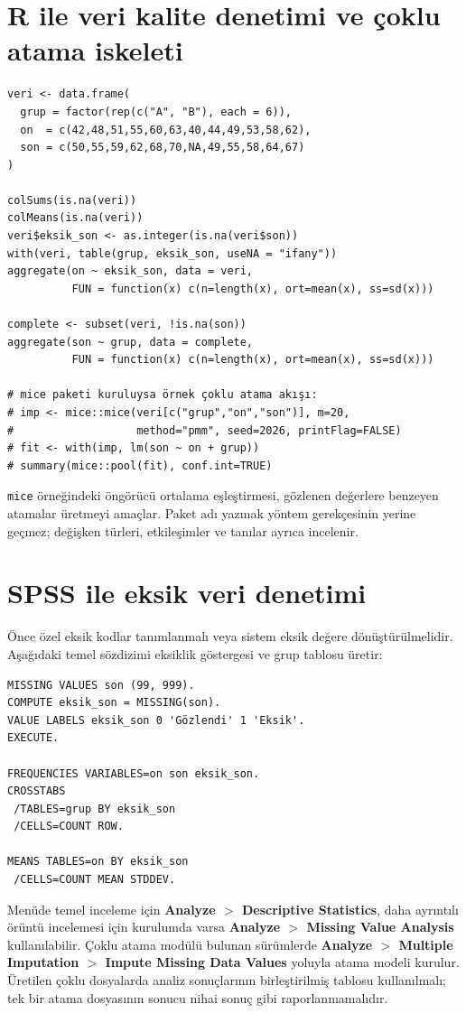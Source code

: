 \section{R ile veri kalite denetimi ve çoklu atama iskeleti}

\begin{lstlisting}[style=prismR]
veri <- data.frame(
  grup = factor(rep(c("A", "B"), each = 6)),
  on  = c(42,48,51,55,60,63,40,44,49,53,58,62),
  son = c(50,55,59,62,68,70,NA,49,55,58,64,67)
)

colSums(is.na(veri))
colMeans(is.na(veri))
veri$eksik_son <- as.integer(is.na(veri$son))
with(veri, table(grup, eksik_son, useNA = "ifany"))
aggregate(on ~ eksik_son, data = veri,
          FUN = function(x) c(n=length(x), ort=mean(x), ss=sd(x)))

complete <- subset(veri, !is.na(son))
aggregate(son ~ grup, data = complete,
          FUN = function(x) c(n=length(x), ort=mean(x), ss=sd(x)))

# mice paketi kuruluysa örnek çoklu atama akışı:
# imp <- mice::mice(veri[c("grup","on","son")], m=20,
#                   method="pmm", seed=2026, printFlag=FALSE)
# fit <- with(imp, lm(son ~ on + grup))
# summary(mice::pool(fit), conf.int=TRUE)
\end{lstlisting}

\texttt{mice} örneğindeki öngörücü ortalama eşleştirmesi, gözlenen değerlere
benzeyen atamalar üretmeyi amaçlar. Paket adı yazmak yöntem gerekçesinin yerine
geçmez; değişken türleri, etkileşimler ve tanılar ayrıca incelenir.

\section{SPSS ile eksik veri denetimi}

Önce özel eksik kodlar tanımlanmalı veya sistem eksik değere dönüştürülmelidir.
Aşağıdaki temel sözdizimi eksiklik göstergesi ve grup tablosu üretir:

\begin{lstlisting}[style=prismSPSS]
MISSING VALUES son (99, 999).
COMPUTE eksik_son = MISSING(son).
VALUE LABELS eksik_son 0 'Gözlendi' 1 'Eksik'.
EXECUTE.

FREQUENCIES VARIABLES=on son eksik_son.
CROSSTABS
 /TABLES=grup BY eksik_son
 /CELLS=COUNT ROW.

MEANS TABLES=on BY eksik_son
 /CELLS=COUNT MEAN STDDEV.
\end{lstlisting}

Menüde temel inceleme için \textbf{Analyze $>$ Descriptive Statistics}, daha
ayrıntılı örüntü incelemesi için kurulumda varsa \textbf{Analyze $>$ Missing
Value Analysis} kullanılabilir. Çoklu atama modülü bulunan sürümlerde
\textbf{Analyze $>$ Multiple Imputation $>$ Impute Missing Data Values}
yoluyla atama modeli kurulur. Üretilen çoklu dosyalarda analiz sonuçlarının
birleştirilmiş tablosu kullanılmalı; tek bir atama dosyasının sonucu nihai
sonuç gibi raporlanmamalıdır.

